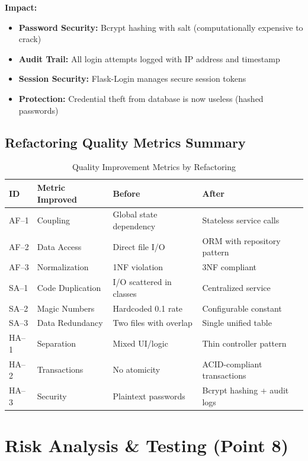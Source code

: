 \textbf{Impact:}
\begin{itemize}
  \item \textbf{Password Security:} Bcrypt hashing with salt (computationally expensive to crack)
  \item \textbf{Audit Trail:} All login attempts logged with IP address and timestamp
  \item \textbf{Session Security:} Flask-Login manages secure session tokens
  \item \textbf{Protection:} Credential theft from database is now useless (hashed passwords)
\end{itemize}

\section{Refactoring Quality Metrics Summary}

\begin{table}[h]
  \centering
  \caption{Quality Improvement Metrics by Refactoring}
  \begin{tabular}{p{1.5cm} p{4cm} p{3.5cm} p{4cm}}
    \toprule
    \textbf{ID} & \textbf{Metric Improved} & \textbf{Before} & \textbf{After} \\
    \midrule
    AF--1 & Coupling & Global state dependency & Stateless service calls \\
    AF--2 & Data Access & Direct file I/O & ORM with repository pattern \\
    AF--3 & Normalization & 1NF violation & 3NF compliant \\
    SA--1 & Code Duplication & I/O scattered in classes & Centralized service \\
    SA--2 & Magic Numbers & Hardcoded 0.1 rate & Configurable constant \\
    SA--3 & Data Redundancy & Two files with overlap & Single unified table \\
    HA--1 & Separation & Mixed UI/logic & Thin controller pattern \\
    HA--2 & Transactions & No atomicity & ACID-compliant transactions \\
    HA--3 & Security & Plaintext passwords & Bcrypt hashing + audit logs \\
    \bottomrule
  \end{tabular}
\end{table}

\chapter{Risk Analysis \& Testing (Point 8)}

